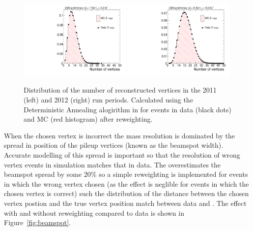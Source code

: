 \begin{figure}
  \begin{center}
  \includegraphics[width=0.49\textwidth]{ch3_comm_anal_comps/plots/nvtx_zmumu_2011.pdf}
  \includegraphics[width=0.49\textwidth]{ch3_comm_anal_comps/plots/nvtx_zmumu_2012.pdf}
  \caption{Distribution of the number of reconstructed vertices in the 2011 (left) and 2012 (right) run periods. Calculated using the Deterministic Annealing alogirithm in  for \Zmumu events in data (black dots) and MC (red histogram) after reweighting.}
  \label{fig:pileup}
  \end{center}
\end{figure}

When the chosen vertex is incorrect the mass resolution is dominated by the spread in position of the pileup vertices (known as the beamspot width). Accurate modelling of this spread is important so that the resolution of wrong vertex events in simulation matches that in data. The \MC overestimates the beamspot spread by some 20\% so a simple reweighting is implemented for \MC events in which the wrong vertex chosen (as the effect is neglible for events in which the chosen vertex is correct) such the distribution of the distance between the chosen vertex postion and the true vertex position match between data and \MC. The effect with and without reweighting compared to data is shown in Figure~\ref{fig:beamspot}.

